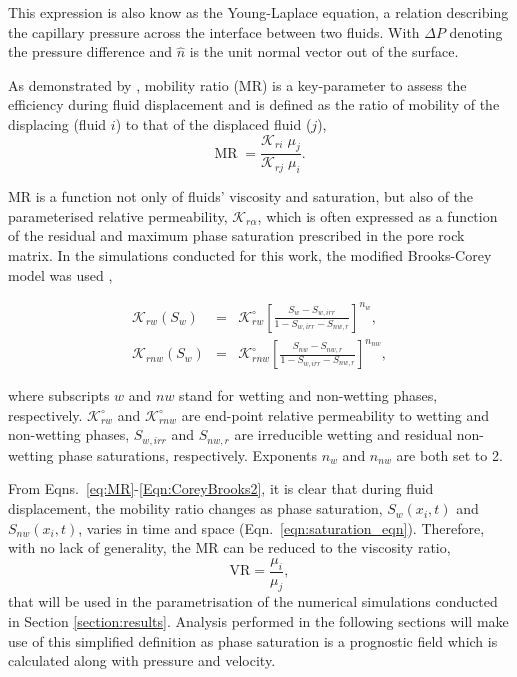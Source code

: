 \documentclass[preprint,authoryear,12pt]{elsarticle}
\newcommand{\frc}{\displaystyle\frac}
\begin{document}
\noindent This expression is also know as the Young-Laplace equation, a relation describing the capillary pressure across the interface between two fluids. With $\Delta P$ denoting the pressure difference and $\hat{n}$ is the unit normal vector out of the surface. 

\medskip
As demonstrated by \citet{habermann_1960}, mobility ratio (MR) is a key-parameter to assess the efficiency during fluid displacement and is defined as the ratio of mobility of the displacing (fluid $i$) to that of the displaced fluid ($j$),
\begin{equation}
 \text{MR} \; = \frac{\mathcal{K}_{ri} \; \mu_{j}}{\mathcal{K}_{rj} \; \mu_{i}}. 
\label{eq:MR}
\end{equation}

\noindent MR is a function not only of fluids' viscosity and saturation, but also of the parameterised relative permeability, $\mathcal{K}_{r\alpha}$, which is often expressed as a function of the residual and maximum phase saturation prescribed in the pore rock matrix. In the simulations conducted for this work, the modified Brooks-Corey model was used \citep{alpak_1999,brooks_1964},

\begin{eqnarray}
  \mathcal{K}_{rw}\left(S_{w}\right) &=& \mathcal{K}^{\circ}_{rw}\left[\frc{S_{w}-S_{w,irr}}{1-S_{w,irr}-S_{nw,r}}\right]^{n_{w}}, \label{Eqn:CoreyBrooks1}\\
  \mathcal{K}_{rnw}\left(S_{w}\right) &=& \mathcal{K}^{\circ}_{rnw}\left[\frc{S_{nw}-S_{nw,r}}{1-S_{w,irr}-S_{nw,r}}\right]^{n_{nw}}, \label{Eqn:CoreyBrooks2}
\end{eqnarray}

\noindent where subscripts $w$ and $nw$ stand for wetting and non-wetting phases, respectively. $\mathcal{K}^{\circ}_{rw}$ and $\mathcal{K}^{\circ}_{rnw}$ are end-point relative permeability to wetting and non-wetting phases, $S_{w,irr}$ and $S_{nw,r}$ are irreducible wetting and residual non-wetting phase saturations, respectively. Exponents $n_{w}$ and $n_{nw}$ are both set to 2.

\medskip
\noindent From Eqns.~\ref{eq:MR}-\ref{Eqn:CoreyBrooks2}, it is clear that during fluid displacement, the mobility ratio changes as phase saturation, $S_{w}\left(x_{i},t\right)$ and $S_{nw}\left(x_{i},t\right)$, varies in time and space (Eqn.~\ref{eqn:saturation_eqn}). Therefore, with no lack of generality, the MR can be reduced to the viscosity ratio,
\begin{displaymath}
    \text{VR} = \frc{\mu_{i}}{\mu_{j}},
\end{displaymath}
 that will be used in the parametrisation of the numerical simulations conducted in Section \ref{section:results}. Analysis performed in the following sections will make use of this simplified definition as phase saturation is a prognostic field which is calculated along with pressure and velocity.
\end{document}
